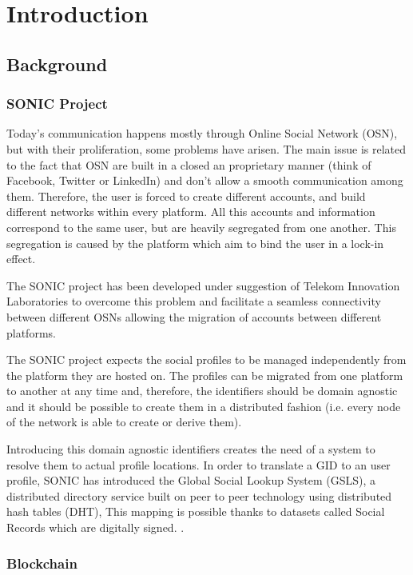 \chapter{Introduction}
\label{introduction}

\section{Background}

\subsection{SONIC Project}
Today’s communication happens mostly through Online Social Network (OSN), but with their proliferation, some problems have arisen. The main issue is related to the fact that OSN are built in a closed an proprietary manner (think of Facebook, Twitter or LinkedIn) and don’t allow a smooth  communication among them. Therefore, the user is forced to create different accounts, and build different networks within every platform. All this accounts and information correspond to the same user, but are heavily segregated from one another. This segregation is caused by the platform which aim to bind the user in a lock-in effect.

The SONIC project has been developed under suggestion of Telekom Innovation Laboratories to overcome this problem and facilitate a seamless connectivity between different OSNs \citep{gondor2014sonic} allowing the migration of accounts between different platforms.

The SONIC project expects the social profiles to be managed independently from the platform they are hosted on. The profiles can be migrated from one platform to another at any time and, therefore, the identifiers should be domain agnostic and it should be possible to create them in a distributed fashion (i.e. every node of the network is able to create or derive them). 

Introducing this domain agnostic identifiers creates the need of a system to resolve them to actual profile locations. In order to translate a GID to an user profile, SONIC has introduced the Global Social Lookup System (GSLS), a distributed directory service built on peer to peer technology using distributed hash tables (DHT), This mapping is possible thanks to datasets called Social Records which are digitally signed. \cite{gondor2014sonic}.

\subsection{Blockchain}

